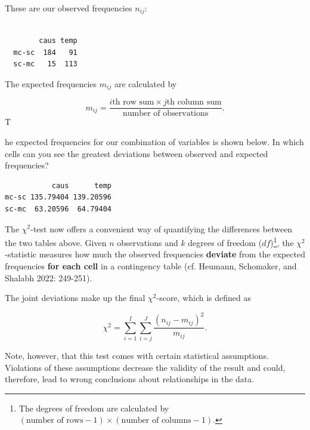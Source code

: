\documentclass[
  11pt,
  letterpaper,
  DIV=11,
  numbers=noendperiod]{scrreprt}
\begin{document}
These are our observed frequencies \(n_{ij}\):

\begin{verbatim}
       
        caus temp
  mc-sc  184   91
  sc-mc   15  113
\end{verbatim}

The expected frequencies \(m_{ij}\) are calculated by

\[
m_{ij} = \frac{i\textrm{th row sum} \times j \textrm{th column sum}}{\textrm{number of observations}}.
\] T

he expected frequencies for our combination of variables is shown below.
In which cells can you see the greatest deviations between observed and
expected frequencies?

\begin{verbatim}
           caus      temp
mc-sc 135.79404 139.20596
sc-mc  63.20596  64.79404
\end{verbatim}

The \(\chi^2\)-test now offers a convenient way of quantifying the
differences between the two tables above. Given \(n\) observations and
\(k\) degrees of freedom (\(df\))\footnote{The degrees of freedom are
  calculated by
  \((\textrm{number of rows} -1) \times (\textrm{number of columns} - 1)\).},
the \(\chi^2\)-statistic measures how much the observed frequencies
\textbf{deviate} from the expected frequencies \textbf{for each cell} in
a contingency table (cf. Heumann, Schomaker, and Shalabh 2022: 249-251).

\begin{tcolorbox}[enhanced jigsaw, toprule=.15mm, opacitybacktitle=0.6, coltitle=black, arc=.35mm, colback=white, title=\textcolor{quarto-callout-note-color}{\faInfo}\hspace{0.5em}{Mathematical details: Formal definition of the chi-square test}, titlerule=0mm, toptitle=1mm, bottomtitle=1mm, breakable, rightrule=.15mm, opacityback=0, bottomrule=.15mm, leftrule=.75mm, colframe=quarto-callout-note-color-frame, left=2mm, colbacktitle=quarto-callout-note-color!10!white]

The joint deviations make up the final \(\chi^2\)-score, which is
defined as

\[
\chi^2 = \sum_{i=1}^{I}\sum_{i=j}^{J}{\frac{(n_{ij} - m_{ij})^2}{m_{ij}}}.
\]

\end{tcolorbox}

Note, however, that this test comes with certain statistical
assumptions. Violations of these assumptions decrease the validity of
the result and could, therefore, lead to wrong conclusions about
relationships in the data.
\end{document}
